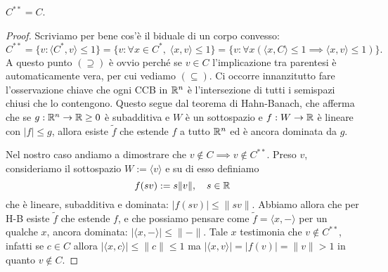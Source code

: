 \begin{proposizione}
	$C^{**} = C$.
\end{proposizione}
\begin{proof}
	Scriviamo per bene cos'è il biduale di un corpo convesso: 
	$$C^{**} = \{v: \langle C^{*}, v\rangle \leq 1\} = \{v:\forall x\in C^{*},\;\langle x,v\rangle\leq1\} = \{v:\forall x(\langle x,C\rangle\leq1\implies\langle x,v\rangle\leq1)\}.$$
	A questo punto $(\supseteq)$ è ovvio perché se $v\in C$ l'implicazione tra parentesi è automaticamente vera, per cui vediamo $(\subseteq)$. Ci occorre innanzitutto fare l'osservazione chiave che ogni CCB in $\mathbb{R}^{n}$ è l'intersezione di tutti i semispazi chiusi che lo contengono. Questo segue dal teorema di Hahn-Banach, che afferma che se $g:\mathbb{R}^{n}\to\mathbb{R}\geq0$ è subadditiva e $W$ è un sottospazio e $f:W\to\mathbb{R}$ è lineare con $|f|\leq g$, allora esiste $\tilde f$ che estende $f$ a tutto $\mathbb{R}^{n}$ ed è ancora dominata da $g$. 
	
	Nel nostro caso andiamo a dimostrare che $v\not\in C\implies v\not\in C^{**}$.
	Preso $v$, consideriamo il sottospazio $W:=\langle v\rangle$ e su di esso definiamo 
	$$f(sv) := s\|v\|,\quad s\in\mathbb{R}$$
	che è lineare, subadditiva e dominata: $|f(sv)|\leq\|sv\|$.
	Abbiamo allora che per H-B esiste $\tilde f$ che estende $f$, e che possiamo pensare come $\tilde f = \langle x, -\rangle$ per un qualche $x$, ancora dominata: $|\langle x, -\rangle|\leq \|-\|$.
	Tale $x$ testimonia che $v\not\in C^{**}$, infatti se $c\in C$ allora $|\langle x, c\rangle|\leq\| c\|\leq 1$ ma $|\langle x, v\rangle| = |f(v)| = \|v\|>1$ in quanto $v\not\in C$.
\end{proof}

